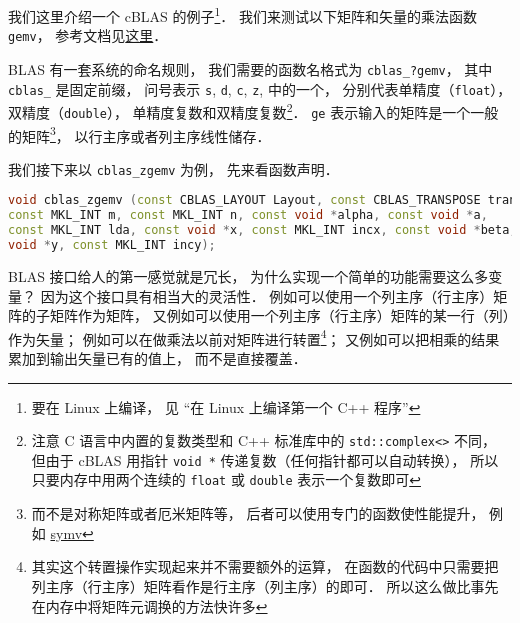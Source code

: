 我们这里介绍一个 cBLAS 的例子\footnote{要在 Linux 上编译， 见 “在 Linux 上编译第一个 C++ 程序”}． 我们来测试以下矩阵和矢量的乘法函数 \lstinline|gemv|， 参考文档见\href{https://software.intel.com/en-us/node/834919#88940C4E-0889-46C3-B6CF-F8B6EA6CF4BC}{这里}．

BLAS 有一套系统的命名规则， 我们需要的函数名格式为 \lstinline|cblas_?gemv|， 其中 \lstinline|cblas_| 是固定前缀， 问号表示 \lstinline|s|, \lstinline|d|, \lstinline|c|, \lstinline|z|, 中的一个， 分别代表单精度（\lstinline|float|）， 双精度（\lstinline|double|）， 单精度复数和双精度复数\footnote{注意 C 语言中内置的复数类型和 C++ 标准库中的 \lstinline|std::complex<>| 不同， 但由于 cBLAS 用指针 \lstinline|void *| 传递复数（任何指针都可以自动转换）， 所以只要内存中用两个连续的 \lstinline|float| 或 \lstinline|double| 表示一个复数即可}． \lstinline|ge| 表示输入的矩阵是一个一般的矩阵\footnote{而不是对称矩阵或者厄米矩阵等， 后者可以使用专门的函数使性能提升， 例如 \href{https://software.intel.com/en-us/node/834934}{symv}}， 以行主序或者列主序线性储存．

我们接下来以 \lstinline|cblas_zgemv| 为例， 先来看函数声明．
\begin{lstlisting}[language=cpp]
void cblas_zgemv (const CBLAS_LAYOUT Layout, const CBLAS_TRANSPOSE trans,
const MKL_INT m, const MKL_INT n, const void *alpha, const void *a,
const MKL_INT lda, const void *x, const MKL_INT incx, const void *beta,
void *y, const MKL_INT incy);
\end{lstlisting}

BLAS 接口给人的第一感觉就是冗长， 为什么实现一个简单的功能需要这么多变量？ 因为这个接口具有相当大的灵活性． 例如可以使用一个列主序（行主序）矩阵的子矩阵作为矩阵， 又例如可以使用一个列主序（行主序）矩阵的某一行（列）作为矢量； 例如可以在做乘法以前对矩阵进行转置\footnote{其实这个转置操作实现起来并不需要额外的运算， 在函数的代码中只需要把列主序（行主序）矩阵看作是行主序（列主序）的即可． 所以这么做比事先在内存中将矩阵元调换的方法快许多}； 又例如可以把相乘的结果累加到输出矢量已有的值上， 而不是直接覆盖．

